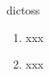 \begin{prework}{ dictoss }
  \begin{enumerate}
  \item xxx
  \item xxx
  \end{enumerate}
\end{prework}
